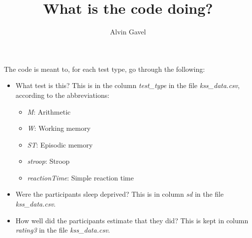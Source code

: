 \documentclass[10pt, twoside,a4paper]{article}
\title{What is the code doing?}
\author{Alvin Gavel}
\date{}
\begin{document}
\maketitle

The code is meant to, for each test type, go through the following:
\begin{itemize}
\item What test is this? This is in the column \emph{test\_type} in the file \emph{kss\_data.csv}, according to the abbreviations:
\begin{itemize}
\item \emph{M}: Arithmetic
\item \emph{W}: Working memory
\item \emph{ST}: Episodic memory
\item \emph{stroop}: Stroop
\item \emph{reactionTime}: Simple reaction time
\end{itemize}
\item Were the participants sleep deprived? This is in column \emph{sd} in the file \emph{kss\_data.csv}.
\item How well did the participants estimate that they did? This is kept in column \emph{rating3} in the file \emph{kss\_data.csv}.
\end{itemize}
\end{document}
